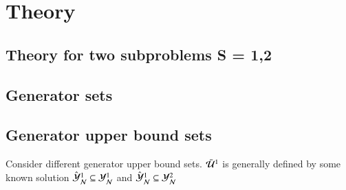 \section{Theory}

\subsection{Theory for two subproblems S = {1,2}}

\subsection{Generator sets}
	
\subsection{Generator upper bound sets}
Consider different generator upper bound sets. $\bar{\mathcal{U}}^{1}$ is generally defined by some known solution $\hat{\mathcal{Y}}_\mathcal{N}^1 \subseteq \mathcal{Y}_{\mathcal{N}}^1$ and  $\hat{\mathcal{Y}}_\mathcal{N}^1 \subseteq \mathcal{Y}_{\mathcal{N}}^2$


